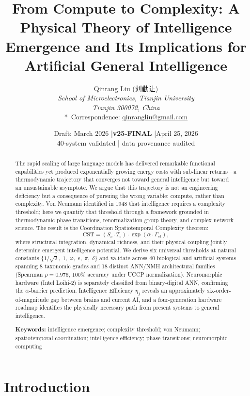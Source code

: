 \documentclass[12pt]{article}
\title{\textbf{From Compute to Complexity: A Physical Theory of Intelligence Emergence and Its Implications for Artificial General Intelligence}}
\author{Qinrang Liu (刘勤让)\\[6pt]
\textit{School of Microelectronics, Tianjin University}\\
\textit{Tianjin 300072, China}\\[4pt]
*~Correspondence: \href{mailto:qinrangliu@gmail.com}{qinrangliu@gmail.com}}
\date{Draft: March 2026 \quad|\quad \textbf{v25-FINAL} \quad|\quad April 25, 2026\\
40-system validated | data provenance audited}
\newcommand{\CST}{\mathrm{CST}}
\newcommand{\Sc}{S_c}
\newcommand{\Tc}{T_c}
\newcommand{\Gst}{\Gamma_{st}}
\newcommand{\etaI}{\eta_I}
\begin{document}
\maketitle
\thispagestyle{empty}

\begin{abstract}
The rapid scaling of large language models has delivered remarkable functional capabilities yet produced exponentially growing energy costs with sub-linear returns---a thermodynamic trajectory that converges not toward general intelligence but toward an unsustainable asymptote. We argue that this trajectory is not an engineering deficiency but a consequence of pursuing the wrong variable: compute, rather than complexity. Von Neumann identified in 1948 that intelligence requires a complexity threshold; here we quantify that threshold through a framework grounded in thermodynamic phase transitions, renormalization group theory, and complex network science. The result is the Coordination Spatiotemporal Complexity theorem:
\[
\CST = (\Sc \cdot \Tc) \cdot \exp(\alpha \cdot \Gst),
\]
where structural integration, dynamical richness, and their physical coupling jointly determine emergent intelligence potential. We derive six universal thresholds at natural constants $\{1/\sqrt{2},\; 1,\; \varphi,\; e,\; \pi,\; \delta\}$ and validate across 40 biological and artificial systems spanning 8 taxonomic grades and 18 distinct ANN/NMH architectural families (Spearman $\rho = 0.976$, 100\% accuracy under UCCP normalization). Neuromorphic hardware (Intel Loihi-2) is separately classified from binary-digital ANN, confirming the $\alpha$-barrier prediction. Intelligence Efficiency $\etaI$ reveals an approximately six-order-of-magnitude gap between brains and current AI, and a four-generation hardware roadmap identifies the physically necessary path from present systems to general intelligence.

\smallskip
\noindent\textbf{Keywords:} intelligence emergence; complexity threshold; von Neumann; spatiotemporal coordination; intelligence efficiency; phase transitions; neuromorphic computing
\end{abstract}

\newpage
\tableofcontents
\newpage

\section{Introduction}
\end{document}
